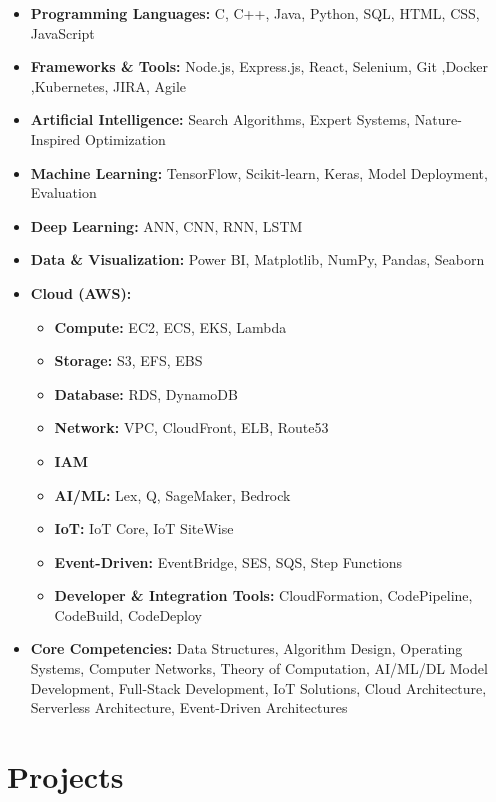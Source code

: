 \documentclass[10pt,a4paper]{article}
\begin{document}
\begin{itemize}

    \item \textbf{Programming Languages:} C, C++, Java, Python, SQL, HTML, CSS, JavaScript
    \item \textbf{Frameworks \& Tools:} Node.js, Express.js, React, Selenium, Git ,Docker ,Kubernetes, JIRA, Agile
    \item \textbf{Artificial Intelligence:} Search Algorithms, Expert Systems, Nature-Inspired Optimization
    \item \textbf{Machine Learning:} TensorFlow, Scikit-learn, Keras, Model Deployment, Evaluation
    \item \textbf{Deep Learning:} ANN, CNN, RNN, LSTM
    \item \textbf{Data \& Visualization:} Power BI, Matplotlib, NumPy, Pandas, Seaborn
    \item \textbf{Cloud (AWS):} 
    \begin{itemize}
        \item \textbf{Compute:} EC2, ECS, EKS, Lambda
        \item \textbf{Storage:} S3, EFS, EBS
        \item \textbf{Database:} RDS, DynamoDB
        \item \textbf{Network:} VPC, CloudFront, ELB, Route53
        \item \textbf{IAM}
        \item \textbf{AI/ML:} Lex, Q, SageMaker, Bedrock
        \item \textbf{IoT:} IoT Core, IoT SiteWise
        \item \textbf{Event-Driven:} EventBridge, SES, SQS, Step Functions
        \item \textbf{Developer \& Integration Tools:} CloudFormation, CodePipeline, CodeBuild, CodeDeploy
    \end{itemize}

    \item \textbf{Core Competencies:} Data Structures, Algorithm Design, Operating Systems, Computer Networks, Theory of Computation, AI/ML/DL Model Development, Full-Stack Development, IoT Solutions, Cloud Architecture, Serverless Architecture, Event-Driven Architectures

\end{itemize}



\section*{Projects}
\end{document}
